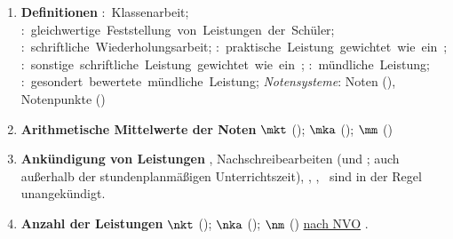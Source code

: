 \begin{enumerate}[label=\textbf{(\arabic*)}, align=left, leftmargin=*]
	\item \textbf{Definitionen} { \thisfontsize \mbox{\textbf{}: Klassenarbeit}; \mbox{\textbf{}: gleichwertige Feststellung von Leistungen der Schüler}; \mbox{\textbf{}: schriftliche Wiederholungsarbeit};  \linebreak \mbox{\textbf{}: praktische Leistung gewichtet wie ein }; \mbox{\textbf{}: sonstige schriftliche Leistung gewichtet wie ein };   \linebreak \mbox{\textbf{}: mündliche Leistung}; \mbox{\textbf{}: gesondert bewertete mündliche Leistung}; \textit{Notensysteme}: Noten (\textbf{}), Notenpunkte (\textbf{}) }
	
	\item \textbf{Arithmetische Mittelwerte der Noten}  { \thisfontsize $\mkt$ (\catkt); $\mka$ (\catka); $\mm$ (\catm) }
	
	
	\item \textbf{Ankündigung von Leistungen} { \thisfontsize {}, Nachschreibearbeiten ( und ; auch außerhalb der stundenplanmäßigen Unterrichtszeit), , , \catm~sind in der Regel unangekündigt.}
	\item \textbf{Anzahl der Leistungen} { \thisfontsize $\nkt$ (\catkt); $\nka$ (\catka); $\nm$ (\catm) \href{\nvourl}{nach NVO} \cite{nvo}}.
	

\end{enumerate}
